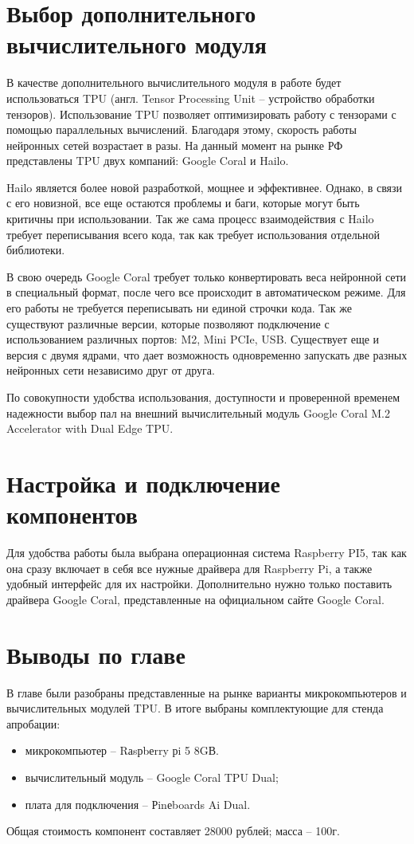 \section{Выбор дополнительного вычислительного модуля}
В качестве дополнительного вычислительного модуля в работе будет использоваться TPU (англ. Tensor Processing Unit -- устройство обработки тензоров). Использование TPU позволяет оптимизировать работу с тензорами с помощью параллельных вычислений.
Благодаря этому, скорость работы нейронных сетей возрастает в разы. На данный момент на рынке РФ представлены TPU двух компаний: Google Coral и Hailo. 

Hailo является более новой разработкой, мощнее и эффективнее. Однако, в связи с его новизной, все еще остаются проблемы и баги, которые могут быть критичны при использовании. Так же сама процесс взаимодействия с Hailo требует переписывания всего кода, так как требует использования отдельной библиотеки. 

В свою очередь Google Coral требует только конвертировать веса нейронной сети в специальный формат, после чего все происходит в автоматическом режиме. Для его работы не требуется переписывать ни единой строчки кода. 
Так же существуют различные версии, которые позволяют подключение с использованием различных портов: M2, Mini PCIe, USB. 
Существует еще и версия с двумя ядрами, что дает возможность одновременно запускать две разных нейронных сети независимо друг от друга. 

По совокупности удобства использования, доступности и проверенной временем надежности выбор пал на внешний вычислительный модуль Google Coral M.2 Accelerator with Dual Edge TPU. 

\section{Настройка и подключение компонентов}
Для удобства работы была выбрана операционная система Raspberry PI5, так как она сразу включает в себя все нужные драйвера для Raspberry Pi, а также удобный интерфейс для их настройки. 
Дополнительно нужно только поставить драйвера Google Coral, представленные на официальном сайте Google Coral. 

\section{Выводы по главе}
В главе были разобраны представленные на рынке варианты микрокомпьютеров и вычислительных модулей TPU. В итоге выбраны комплектующие для стенда апробации:
\begin{itemize}
  \item микрокомпьютер -- Rаsрbеrry рi 5 8GВ.
  \item вычислительный модуль -- Google Coral TPU Dual;
  \item плата для подключения -- Рinеboards Ai Dual.
\end{itemize}
Общая стоимость компонент составляет 28000 рублей; масса -- 100г. 
